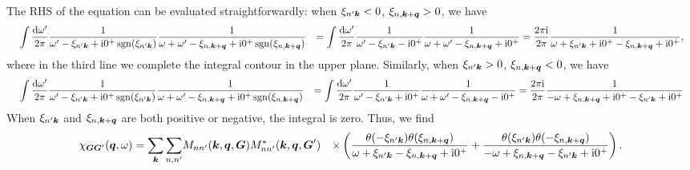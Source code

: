 \documentclass[hyperref, a4paper, 12pt]{report}
\DeclareMathOperator{\sgn}{sgn}
\newcommand*{\ii}{\mathrm{i}}
\def\\{}%
\begin{document}
The RHS of the equation can be evaluated straightforwardly:
when $\xi_{n' \vb*{k}} < 0$, $\xi_{n ,\vb*{k} + \vb*{q}} > 0$, 
we have 
\[
    \begin{aligned}
        &\quad \int \frac{\dd{\omega'}}{2\pi} 
        \frac{1}{\omega' - \xi_{n' \vb*{k}} + \ii 0^+ \sgn(\xi_{n' \vb*{k}})} 
        \frac{1}{\omega + \omega' - \xi_{n, \vb*{k} + \vb*{q}} + \ii 0^+ \sgn(\xi_{n, \vb*{k} + \vb*{q}})} \\
        &= \int \frac{\dd{\omega'}}{2\pi} 
        \frac{1}{\omega' - \xi_{n' \vb*{k}} - \ii 0^+ } 
        \frac{1}{\omega + \omega' - \xi_{n, \vb*{k} + \vb*{q}} + \ii 0^+ } \\
        &= \frac{2\pi \ii}{2\pi} \frac{1}{\omega
        + \xi_{n' \vb*{k}} + \ii 0^+ - \xi_{n, \vb*{k} + \vb*{q}} + \ii 0^+ },
    \end{aligned}
\]
where in the third line we complete the integral contour in the upper plane.
Similarly, when $\xi_{n' \vb*{k}} > 0$, $\xi_{n, \vb*{k} + \vb*{q}} < 0$, 
we have 
\[
    \begin{aligned}
        &\quad \int \frac{\dd{\omega'}}{2\pi} 
        \frac{1}{\omega' - \xi_{n' \vb*{k}} + \ii 0^+ \sgn(\xi_{n' \vb*{k}})} 
        \frac{1}{\omega + \omega' - \xi_{n, \vb*{k} + \vb*{q}} + \ii 0^+ \sgn(\xi_{n, \vb*{k} + \vb*{q}})} \\
        &= \int \frac{\dd{\omega'}}{2\pi} 
        \frac{1}{\omega' - \xi_{n' \vb*{k}} + \ii 0^+ } 
        \frac{1}{\omega + \omega' - \xi_{n, \vb*{k} + \vb*{q}} - \ii 0^+ } \\
        &= \frac{2\pi \ii}{2\pi} \frac{1}{
            - \omega + \xi_{n, \vb*{k} + \vb*{q}} + \ii 0^+ 
            - \xi_{n' \vb*{k}} + \ii 0^+
        }
    \end{aligned}
\]
When $\xi_{n' \vb*{k}}$ and $\xi_{n, \vb*{k} + \vb*{q}}$ are both positive or negative, 
the integral is zero.
Thus, we find 
\begin{equation}
    \begin{aligned}
        \chi_{\vb*{G} \vb*{G}'}(\vb*{q}, \omega) = \sum_{\vb*{k}} \sum_{n, n'} 
        &M_{n n'} (\vb*{k}, \vb*{q}, \vb*{G}) M^*_{nn'} (\vb*{k}, \vb*{q}, \vb*{G}') \\
        &\times \left(
            \frac{
                \theta(- \xi_{n' \vb*{k}}) \theta(\xi_{n, \vb*{k} + \vb*{q}})
            }{
                \omega + \xi_{n' \vb*{k}} - \xi_{n, \vb*{k} + \vb*{q}} + \ii 0^+
            }
            + \frac{
                \theta(\xi_{n' \vb*{k}}) \theta(- \xi_{n, \vb*{k} + \vb*{q}})
            }{
                - \omega + \xi_{n, \vb*{k} + \vb*{q}} - \xi_{n' \vb*{k}} + \ii 0^+
            }
        \right).
    \end{aligned}
    \label{eq:chi-original}
\end{equation}
\end{document}
